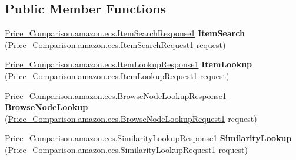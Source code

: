 \subsection*{Public Member Functions}
\begin{DoxyCompactItemize}
\item 
\hypertarget{interface_price___comparison_1_1amazon_1_1ecs_1_1_a_w_s_e_commerce_service_port_type_a418721bf483e50207511554c91ebdc7e}{\hyperlink{class_price___comparison_1_1amazon_1_1ecs_1_1_item_search_response1}{Price\-\_\-\-Comparison.\-amazon.\-ecs.\-Item\-Search\-Response1} {\bfseries Item\-Search} (\hyperlink{class_price___comparison_1_1amazon_1_1ecs_1_1_item_search_request1}{Price\-\_\-\-Comparison.\-amazon.\-ecs.\-Item\-Search\-Request1} request)}\label{interface_price___comparison_1_1amazon_1_1ecs_1_1_a_w_s_e_commerce_service_port_type_a418721bf483e50207511554c91ebdc7e}

\item 
\hypertarget{interface_price___comparison_1_1amazon_1_1ecs_1_1_a_w_s_e_commerce_service_port_type_a15e73f85294a8698ab0f992d732f8785}{\hyperlink{class_price___comparison_1_1amazon_1_1ecs_1_1_item_lookup_response1}{Price\-\_\-\-Comparison.\-amazon.\-ecs.\-Item\-Lookup\-Response1} {\bfseries Item\-Lookup} (\hyperlink{class_price___comparison_1_1amazon_1_1ecs_1_1_item_lookup_request1}{Price\-\_\-\-Comparison.\-amazon.\-ecs.\-Item\-Lookup\-Request1} request)}\label{interface_price___comparison_1_1amazon_1_1ecs_1_1_a_w_s_e_commerce_service_port_type_a15e73f85294a8698ab0f992d732f8785}

\item 
\hypertarget{interface_price___comparison_1_1amazon_1_1ecs_1_1_a_w_s_e_commerce_service_port_type_ade5fee95b40be05b99eab9785ea9e041}{\hyperlink{class_price___comparison_1_1amazon_1_1ecs_1_1_browse_node_lookup_response1}{Price\-\_\-\-Comparison.\-amazon.\-ecs.\-Browse\-Node\-Lookup\-Response1} {\bfseries Browse\-Node\-Lookup} (\hyperlink{class_price___comparison_1_1amazon_1_1ecs_1_1_browse_node_lookup_request1}{Price\-\_\-\-Comparison.\-amazon.\-ecs.\-Browse\-Node\-Lookup\-Request1} request)}\label{interface_price___comparison_1_1amazon_1_1ecs_1_1_a_w_s_e_commerce_service_port_type_ade5fee95b40be05b99eab9785ea9e041}

\item 
\hypertarget{interface_price___comparison_1_1amazon_1_1ecs_1_1_a_w_s_e_commerce_service_port_type_abce1ad554f94603f8f2481285938d9b0}{\hyperlink{class_price___comparison_1_1amazon_1_1ecs_1_1_similarity_lookup_response1}{Price\-\_\-\-Comparison.\-amazon.\-ecs.\-Similarity\-Lookup\-Response1} {\bfseries Similarity\-Lookup} (\hyperlink{class_price___comparison_1_1amazon_1_1ecs_1_1_similarity_lookup_request1}{Price\-\_\-\-Comparison.\-amazon.\-ecs.\-Similarity\-Lookup\-Request1} request)}\label{interface_price___comparison_1_1amazon_1_1ecs_1_1_a_w_s_e_commerce_service_port_type_abce1ad554f94603f8f2481285938d9b0}


\end{DoxyCompactItemize}
